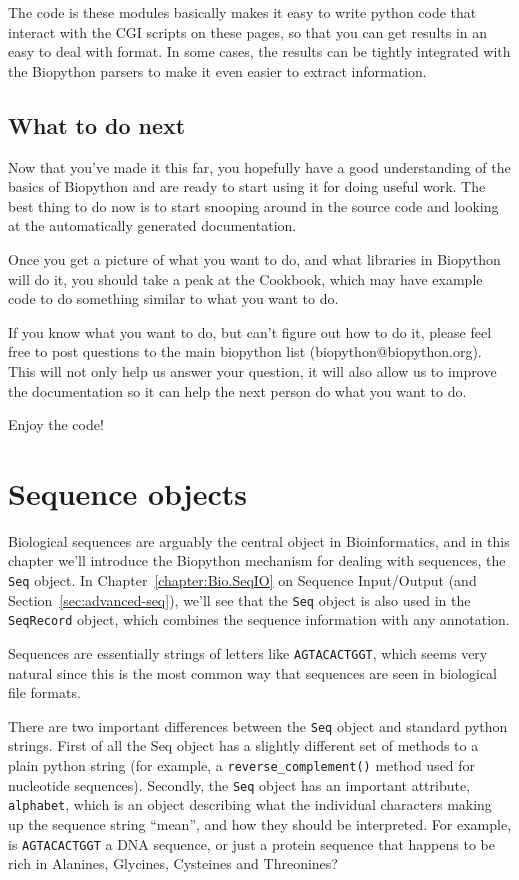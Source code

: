\documentclass{report}
\begin{document}
The code is these modules basically makes it easy to write python code that interact with the CGI scripts on these pages, so that you can get results in an easy to deal with format. In some cases, the results can be tightly integrated with the Biopython parsers to make it even easier to extract information.

\section{What to do next}

Now that you've made it this far, you hopefully have a good understanding of the basics of Biopython and are ready to start using it for doing useful work. The best thing to do now is to start snooping around in the source code and looking at the automatically generated documentation.

Once you get a picture of what you want to do, and what libraries in Biopython will do it, you should take a peak at the Cookbook, which may have example code to do something similar to what you want to do.

If you know what you want to do, but can't figure out how to do it, please feel free to post questions to the main biopython list (biopython@biopython.org). This will not only help us answer your question, it will also allow us to improve the documentation so it can help the next person do what you want to do.

Enjoy the code!

\chapter{Sequence objects}
\label{chapter:Bio.Seq}

Biological sequences are arguably the central object in Bioinformatics, and in this chapter we'll introduce the Biopython mechanism for dealing with sequences, the \verb|Seq| object.
In Chapter~\ref{chapter:Bio.SeqIO} on Sequence Input/Output (and Section~\ref{sec:advanced-seq}), we'll see that the \verb|Seq| object is also used in the \verb|SeqRecord| object, which combines the sequence information with any annotation.

Sequences are essentially strings of letters like \verb|AGTACACTGGT|, which seems very natural since this is the most common way that sequences are seen in biological file formats.

There are two important differences between the \verb|Seq| object and standard python strings.  First of all the Seq object has a slightly different set of methods to a plain python string (for example, a \verb|reverse_complement()| method used for nucleotide sequences).
Secondly, the \verb|Seq| object has an important attribute, \verb|alphabet|, which is an object describing what the individual characters making up the sequence string ``mean'', and how they should be interpreted.  For example, is \verb|AGTACACTGGT| a DNA sequence, or just a protein sequence that happens to be rich in Alanines, Glycines, Cysteines
and Threonines?
\end{document}

